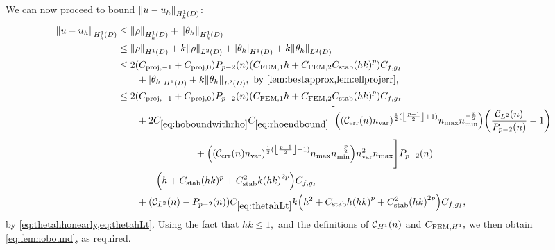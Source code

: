 We can now proceed to bound $\NHokD{u-\uh}$:
\begin{align*}
  \NHokD{u-\uh} & \leq \NHokD{\rho} + \NHokD{\thetah}\\
  &\leq \NHoD{\rho} + k\NLtD{\rho} + \SNHoD{\thetah} + k\NLtD{\thetah}\\
  & \leq 2\mleft(\Cmmofn{-1} + \Cmmofn{0}\mright) \Pfn{p-2}\mleft(n\mright)\mleft(\CFEMo h + \CFEMt \CAnk \mleft(hk\mright)^p\mright) \Cfg\\
  &\quad\quad+ \SNHoD{\thetah} + k\NLtD{\thetah}, \text{ by \cref{lem:bestapprox,lem:ellprojerr},}\\
  &\leq2\mleft(\Cmmofn{-1} + \Cmmofn{0}\mright) \Pfn{p-2}\mleft(n\mright)\mleft(\CFEMo h + \CFEMt \CAnk \mleft(hk\mright)^p\mright) \Cfg\\
  &\quad\quad + 2\CHobound\Crhoendbound \Bigg[ \mleft(\mleft(\En\nvar\mright)^{\half(\floor{\frac{p-1}2}+1)}\nmax\nmin^{-\frac{p}2}\mright) \mleft(\frac{\CLtn(n)}{\Pfn{p-2}\mleft(n\mright)}-1\mright)  \nonumber\\
    &\quad\quad\quad\quad\quad\quad\quad\quad+\mleft(\mleft(\En\nvar\mright)^{\half(\floor{\frac{p-1}2}+1)}\nmax\nmin^{-\frac{p}2}\mright)\nvar^2\nmax \Bigg]\Pfn{p-2}\mleft(n\mright)\\
  &\quad\quad\quad\quad\mleft( h +  \CAnk (hk)^p + \CAnk^2 k\mleft(hk\mright)^{2p}\mright)\Cfg\\
  &\quad\quad+\mleft(\CLtn(n)-\Pfn{p-2}\mleft(n\mright)\mright) \CthetahLt k\mleft(h^2 + \CAnk h\mleft(hk\mright)^p + \CAnk^2 \mleft(hk\mright)^{2p}\mright)\Cfg ,
\end{align*}
by \cref{eq:thetahhonearly,eq:thetahLt}. Using the fact that $hk \leq 1,$ and the definitions of $\mathcal C_{H^{1}}(n)$ and $C_{\mathrm{FEM},H^{1}},$ we then obtain \cref{eq:femhobound}, as required.
\epf

